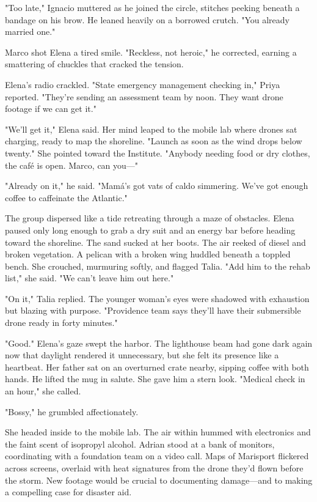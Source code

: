 "Too late," Ignacio muttered as he joined the circle, stitches peeking beneath a bandage on his brow. He leaned heavily on a borrowed crutch. "You already married one."

Marco shot Elena a tired smile. "Reckless, not heroic," he corrected, earning a smattering of chuckles that cracked the tension.

Elena's radio crackled. "State emergency management checking in," Priya reported. "They're sending an assessment team by noon. They want drone footage if we can get it."

"We'll get it," Elena said. Her mind leaped to the mobile lab where drones sat charging, ready to map the shoreline. "Launch as soon as the wind drops below twenty." She pointed toward the Institute. "Anybody needing food or dry clothes, the café is open. Marco, can you—"

"Already on it," he said. "Mamá's got vats of caldo simmering. We've got enough coffee to caffeinate the Atlantic."

The group dispersed like a tide retreating through a maze of obstacles. Elena paused only long enough to grab a dry suit and an energy bar before heading toward the shoreline. The sand sucked at her boots. The air reeked of diesel and broken vegetation. A pelican with a broken wing huddled beneath a toppled bench. She crouched, murmuring softly, and flagged Talia. "Add him to the rehab list," she said. "We can't leave him out here."

"On it," Talia replied. The younger woman's eyes were shadowed with exhaustion but blazing with purpose. "Providence team says they'll have their submersible drone ready in forty minutes."

"Good." Elena's gaze swept the harbor. The lighthouse beam had gone dark again now that daylight rendered it unnecessary, but she felt its presence like a heartbeat. Her father sat on an overturned crate nearby, sipping coffee with both hands. He lifted the mug in salute. She gave him a stern look. "Medical check in an hour," she called.

"Bossy," he grumbled affectionately.

She headed inside to the mobile lab. The air within hummed with electronics and the faint scent of isopropyl alcohol. Adrian stood at a bank of monitors, coordinating with a foundation team on a video call. Maps of Marisport flickered across screens, overlaid with heat signatures from the drone they'd flown before the storm. New footage would be crucial to documenting damage—and to making a compelling case for disaster aid.

